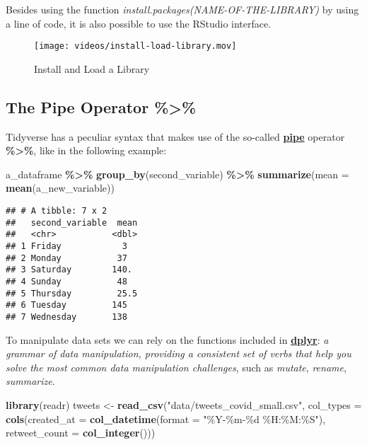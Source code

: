 \documentclass[
]{article}
\newenvironment{Shaded}{\begin{snugshade}}{\end{snugshade}}
\newcommand{\AttributeTok}[1]{\textcolor[rgb]{0.13,0.29,0.53}{#1}}
\newcommand{\FunctionTok}[1]{\textcolor[rgb]{0.13,0.29,0.53}{\textbf{#1}}}
\newcommand{\NormalTok}[1]{#1}
\newcommand{\OtherTok}[1]{\textcolor[rgb]{0.56,0.35,0.01}{#1}}
\newcommand{\SpecialCharTok}[1]{\textcolor[rgb]{0.81,0.36,0.00}{\textbf{#1}}}
\newcommand{\StringTok}[1]{\textcolor[rgb]{0.31,0.60,0.02}{#1}}
\begin{document}
Besides using the function \emph{install.packages(NAME-OF-THE-LIBRARY)} by using a line of code, it is also possible to use the RStudio interface.

\begin{figure}
\centering
\texttt{[image: videos/install-load-library.mov]}
\caption{Install and Load a Library}
\end{figure}

\subsection{The Pipe Operator \%\textgreater\%}\label{the-pipe-operator}

Tidyverse has a peculiar syntax that makes use of the so-called \href{https://style.tidyverse.org/pipes.html}{\textbf{pipe}} operator \textbf{\%\textgreater\%}, like in the following example:

\begin{Shaded}
\begin{Highlighting}[]
\NormalTok{a\_dataframe }\SpecialCharTok{\%\textgreater{}\%}
  \FunctionTok{group\_by}\NormalTok{(second\_variable) }\SpecialCharTok{\%\textgreater{}\%}
  \FunctionTok{summarize}\NormalTok{(}\AttributeTok{mean =} \FunctionTok{mean}\NormalTok{(a\_new\_variable))}
\end{Highlighting}
\end{Shaded}

\begin{verbatim}
## # A tibble: 7 x 2
##   second_variable  mean
##   <chr>           <dbl>
## 1 Friday            3  
## 2 Monday           37  
## 3 Saturday        140. 
## 4 Sunday           48  
## 5 Thursday         25.5
## 6 Tuesday         145  
## 7 Wednesday       138
\end{verbatim}

To manipulate data sets we can rely on the functions included in \href{https://dplyr.tidyverse.org}{\textbf{dplyr}}: \emph{a grammar of data manipulation, providing a consistent set of verbs that help you solve the most common data manipulation challenges}, such as \emph{mutate}, \emph{rename}, \emph{summarize}.

\begin{Shaded}
\begin{Highlighting}[]
\FunctionTok{library}\NormalTok{(readr)}
\NormalTok{tweets }\OtherTok{\textless{}{-}} \FunctionTok{read\_csv}\NormalTok{(}\StringTok{"data/tweets\_covid\_small.csv"}\NormalTok{, }
    \AttributeTok{col\_types =} \FunctionTok{cols}\NormalTok{(}\AttributeTok{created\_at =} \FunctionTok{col\_datetime}\NormalTok{(}\AttributeTok{format =} \StringTok{"\%Y{-}\%m{-}\%d \%H:\%M:\%S"}\NormalTok{), }
        \AttributeTok{retweet\_count =} \FunctionTok{col\_integer}\NormalTok{()))}
\end{Highlighting}
\end{Shaded}
\end{document}
